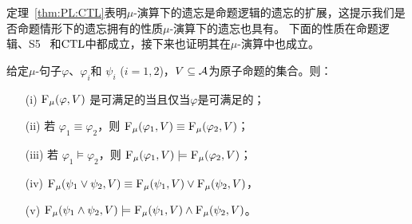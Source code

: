 定理~\ref{thm:PL:CTL}表明$\mu$-演算下的遗忘是命题逻辑的遗忘的扩展，这提示我们是否命题情形下的遗忘拥有的性质$\mu$-演算下的遗忘也具有。
下面的性质在命题逻辑、S5~\cite{Yan:AIJ:2009} 和$\textrm{CTL}$中都成立，接下来也证明其在$\mu$-演算中也成立。
\begin{proposition}
	\label{chapter06:pro:ctl:forget:1}
	给定$\mu$-句子$\varphi$、$\varphi_i$和 $\psi_i$ ($i=1,2$)，$V\subseteq {\cal A}$为原子命题的集合。则：
	\begin{itemize}
		\item[(i)] ${\textsc{F}_{\textsc{$\mu$}}}(\varphi, V)$ 是可满足的当且仅当$\varphi$是可满足的；
		\item[(ii)] 若 $\varphi_1 \equiv \varphi_2$，则 ${\textsc{F}_{\textsc{$\mu$}}}(\varphi_1, V) \equiv {\textsc{F}_{\textsc{$\mu$}}}(\varphi_2, V)$；
		\item[(iii)] 若 $\varphi_1 \models \varphi_2$，则 ${\textsc{F}_{\textsc{$\mu$}}}(\varphi_1, V) \models {\textsc{F}_{\textsc{$\mu$}}}(\varphi_2, V)$；
		\item[(iv)] ${\textsc{F}_{\textsc{$\mu$}}}(\psi_1 \vee \psi_2, V) \equiv {\textsc{F}_{\textsc{$\mu$}}}(\psi_1, V) \vee {\textsc{F}_{\textsc{$\mu$}}}(\psi_2, V)$，
		\item[(v)] ${\textsc{F}_{\textsc{$\mu$}}}(\psi_1 \wedge \psi_2, V) \models {\textsc{F}_{\textsc{$\mu$}}}(\psi_1, V) \wedge {\textsc{F}_{\textsc{$\mu$}}}(\psi_2, V)$。
	\end{itemize}
\end{proposition}
